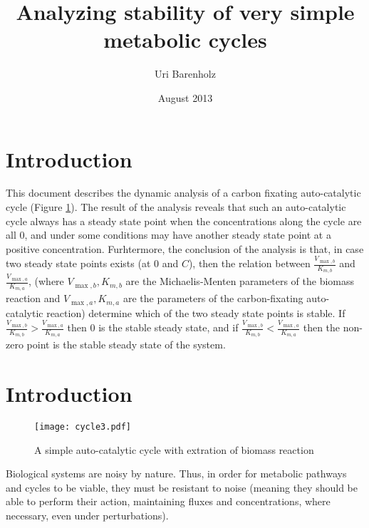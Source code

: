 \documentclass[a4page,notitlepage]{article}
\title{Analyzing stability of very simple metabolic cycles}
\author{Uri Barenholz}
\date{August 2013}
\begin{document}

\section{Introduction}

    This document describes the dynamic analysis of a carbon fixating auto-catalytic cycle (Figure \ref{fig:autocatal}). The result of the analysis reveals that such an auto-catalytic cycle always has a steady state point when the concentrations along the cycle are all 0, and under some conditions may have another steady state point at a positive concentration.
    Furhtermore, the conclusion of the analysis is that, in case two steady state points exists (at 0 and $C$), then the relation between $\frac{V_{\max,b}}{K_{m,b}}$ and $\frac{V_{\max,a}}{K_{m,a}}$, (where $V_{\max,b},K_{m,b}$ are the Michaelis-Menten parameters of the biomass reaction and $V_{\max,a},K_{m,a}$ are the parameters of the carbon-fixating auto-catalytic reaction) determine which of the two steady state points is stable.
    If $\frac{V_{\max,b}}{K_{m,b}} > \frac{V_{\max,a}}{K_{m,a}}$ then 0 is the stable steady state, and if $\frac{V_{\max,b}}{K_{m,b}} < \frac{V_{\max,a}}{K_{m,a}}$ then the non-zero point is the stable steady state of the system.
\section{Introduction}
\begin{figure}[h]
\centering
\texttt{[image: cycle3.pdf]}
\caption{A simple auto-catalytic cycle with extration of biomass reaction}
\label{fig:autocatal}
\end{figure}
Biological systems are noisy by nature.
Thus, in order for metabolic pathways and cycles to be viable, they must be resistant to noise (meaning they should be able to perform their action, maintaining fluxes and concentrations, where necessary, even under perturbations).
\end{document}
